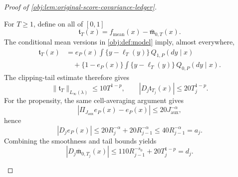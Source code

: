 \documentclass[11pt]{article}
\begin{document}
\begin{proof}[Proof of \cref{obj:lem:original-score-covariance-ledger}]
\begin{enumerate}
For \(T\ge1\), define on all of \([0,1]\)
\[
\mathfrak t_T(x)
=
f_{\mathrm{mean}}(x)-\overline{\mathfrak m}_{0,T}(x).
\]
The conditional mean versions in \cref{obj:def:model} imply, almost everywhere,
\[
\begin{aligned}
\mathfrak t_T(x)
&=
e_P(x)\int\{y-\ell_T(y)\}\,Q_{1,P}(dy\mid x)\\
&\quad+
\{1-e_P(x)\}
\int\{y-\ell_T(y)\}\,Q_{0,P}(dy\mid x).
\end{aligned}
\]
The clipping-tail estimate therefore gives
\[
\|\mathfrak t_T\|_{L_\infty(\lambda)}
\le10T^{1-p},
\qquad
|D_j\mathfrak t_{T_j}(x)|
\le20T_j^{1-p}.
\]
For the propensity, the same cell-averaging argument gives
\[
|\Pi_{J_{\mathrm{aux}}}e_P(x)-e_P(x)|
\le20J_{\mathrm{aux}}^{-\alpha},
\]
hence
\[
|D_je_P(x)|
\le20R_j^{-\alpha}+20R_{j-1}^{-\alpha}
\le40R_{j-1}^{-\alpha}=a_j.
\]
Combining the smoothness and tail bounds yields
\[
|D_j\overline{\mathfrak m}_{0,T_j}(x)|
\le110R_{j-1}^{-s_0}+20T_j^{1-p}=d_j.
\]


\end{enumerate}
\end{proof}
\end{document}
